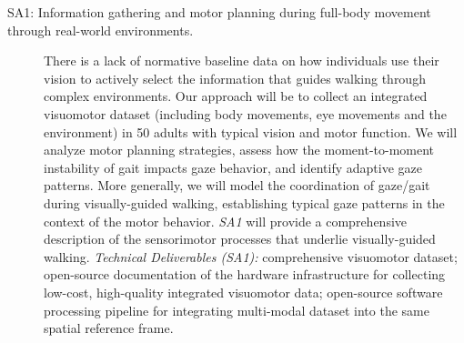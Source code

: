 \begin{description}
	\item[SA1: Information gathering and motor planning during full-body movement through real-world environments.]{There is a lack of normative baseline data on how individuals use their vision to actively select the information that guides walking through complex environments. Our approach will be to collect an integrated visuomotor dataset (including body movements, eye movements and the environment) in 50 adults with typical vision and motor function. We will analyze motor planning strategies, assess how the moment-to-moment instability of gait impacts gaze behavior, and identify adaptive gaze patterns. More generally, we will model the coordination of gaze/gait during visually-guided walking, establishing typical gaze patterns in the context of the motor behavior. \textit{SA1} will provide a comprehensive description of the sensorimotor processes that underlie visually-guided walking. \textit{Technical Deliverables (SA1):} comprehensive visuomotor dataset; open-source documentation of the hardware infrastructure for collecting low-cost, high-quality integrated visuomotor data; open-source software processing pipeline for integrating multi-modal dataset into the same spatial reference frame.}

 


\end{description}
